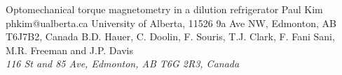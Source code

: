 \begin{conf-abstract}[]
{Optomechanical torque magnetometry in a dilution refrigerator}
{\color{blue} Paul Kim}
{phkim@ualberta.ca}
{University of Alberta, 11526 9a Ave NW, Edmonton, AB T6J7B2, Canada}
{{\color{blue}B.D. Hauer, C. Doolin, F. Souris, T.J. Clark, F. Fani Sani, M.R. Freeman and J.P. Davis}\\ \textit{116 St and 85 Ave, Edmonton, AB T6G 2R3, Canada}\\ 
\decofourleft \decofourright}





\printbibliography[heading=none]

\end{conf-abstract}
